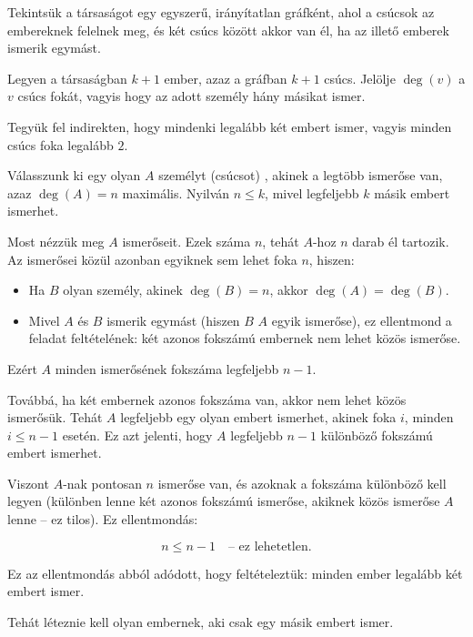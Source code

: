 \begin{solution}
Tekintsük a társaságot egy egyszerű, irányítatlan gráfként, ahol a
csúcsok az embereknek felelnek meg, és két csúcs között akkor van
él, ha az illető emberek ismerik egymást.

Legyen a társaságban $k+1$ ember, azaz a gráfban $k+1$ csúcs. Jelölje
$\deg(v)$ a $v$ csúcs fokát, vagyis hogy az adott személy hány másikat
ismer.

Tegyük fel indirekten, hogy mindenki legalább két embert ismer, vagyis
minden csúcs foka legalább $2$.

Válasszunk ki egy olyan $A$ személyt (csúcsot) , akinek a legtöbb
ismerőse van, azaz $\deg(A)=n$ maximális. Nyilván $n\leq k$, mivel
legfeljebb $k$ másik embert ismerhet.

Most nézzük meg $A$ ismerőseit. Ezek száma $n$, tehát $A$-hoz $n$
darab él tartozik. Az ismerősei közül azonban egyiknek sem lehet foka
$n$, hiszen:
\begin{itemize}
\item Ha $B$ olyan személy, akinek $\deg(B)=n$, akkor $\deg(A)=\deg(B)$. 
\item Mivel $A$ és $B$ ismerik egymást (hiszen $B$ $A$ egyik ismerőse),
ez ellentmond a feladat feltételének: két azonos fokszámú embernek
nem lehet közös ismerőse. 
\end{itemize}
Ezért $A$ minden ismerősének fokszáma legfeljebb $n-1$.

Továbbá, ha két embernek azonos fokszáma van, akkor nem lehet közös
ismerősük. Tehát $A$ legfeljebb egy olyan embert ismerhet, akinek
foka $i$, minden $i\leq n-1$ esetén. Ez azt jelenti, hogy $A$ legfeljebb
$n-1$ különböző fokszámú embert ismerhet.

Viszont $A$-nak pontosan $n$ ismerőse van, és azoknak a fokszáma
különböző kell legyen (különben lenne két azonos fokszámú ismerőse,
akiknek közös ismerőse $A$ lenne -- ez tilos). Ez ellentmondás:

\[
n\leq n-1\quad\text{– ez lehetetlen.}
\]

Ez az ellentmondás abból adódott, hogy feltételeztük: minden ember
legalább két embert ismer.

Tehát léteznie kell olyan embernek, aki csak egy másik embert ismer. 
\end{solution}
